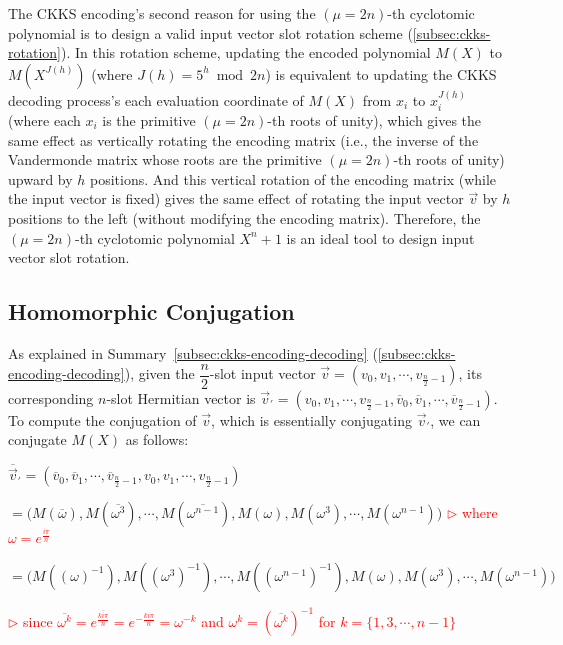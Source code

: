 The CKKS encoding's second reason for using the $(\mu=2n)$-th cyclotomic polynomial is to design a valid input vector slot rotation scheme (\autoref{subsec:ckks-rotation}). In this rotation scheme, updating the encoded polynomial $M(X)$ to $M(X^{J(h)})$ (where $J(h) = 5^h \bmod 2n$) is equivalent to updating the CKKS decoding process's each evaluation coordinate of $M(X)$ from $x_i$ to $x_i^{J(h)}$ (where each $x_i$ is the primitive $(\mu=2n)$-th roots of unity), which gives the same effect as vertically rotating the encoding matrix (i.e., the inverse of the Vandermonde matrix whose roots are the primitive $(\mu=2n)$-th roots of unity) upward by $h$ positions. And this vertical rotation of the encoding matrix (while the input vector is fixed) gives the same effect of rotating the input vector $\vec{v}$ by $h$ positions to the left (without modifying the encoding matrix). Therefore, the $(\mu=2n)$-th cyclotomic polynomial $X^n + 1$ is an ideal tool to design input vector slot rotation. 


\subsection{Homomorphic Conjugation}
\label{subsec:ckks-conjugation}


As explained in Summary~\ref*{subsec:ckks-encoding-decoding} (\autoref{subsec:ckks-encoding-decoding}), given the $\dfrac{n}{2}$-slot input vector $\vec{v} = (v_0, v_1, \cdots, v_{\frac{n}{2}-1})$, its corresponding $n$-slot Hermitian vector is $\vec{v}_{'} = (v_0, v_1, \cdots, v_{\frac{n}{2}-1}, \overline{v}_0, \overline{v}_1, \cdots, \overline{v}_{\frac{n}{2}-1})$. To compute the conjugation of $\vec{v}$, which is essentially conjugating $\vec{v}_{'}$, we can conjugate $M(X)$ as follows:

$\overline{\vec{v}}_{'} = (\overline{v}_0, \overline{v}_1, \cdots, \overline{v}_{\frac{n}{2}-1}, v_0, v_1, \cdots, v_{\frac{n}{2}-1})$

$= \bm{(}M(\overline{\omega}), M(\overline{\omega^{3}}), \cdots, M(\overline{\omega^{n-1}}), M(\omega), M(\omega^{3}), \cdots, M(\omega^{n-1})\bm{)}$ \textcolor{red}{ $\rhd$ where $\omega = e^{\frac{i\pi}{n}}$}


$= \bm{(}M((\omega)^{-1}), M((\omega^{3})^{-1}), \cdots, M((\omega^{n-1})^{-1}), M(\omega), M(\omega^{3}), \cdots, M(\omega^{n-1})\bm{)}$ 

\textcolor{red}{ $\rhd$ since $\overline{\omega^k} = e^{\overline{\frac{ki\pi}{n}}} = e^{-\frac{ki\pi}{n}} = \omega^{-k}$ and $\omega^{k} = (\overline{\omega^k})^{-1}$ for $k = \{1, 3, \cdots, n-1\}$}

